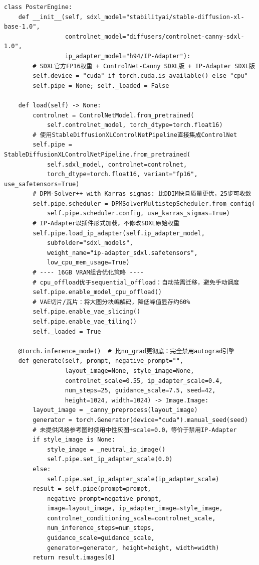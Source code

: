 \documentclass[12pt,a4paper]{ctexart}
\begin{document}
\begin{lstlisting}[style=pycode, caption={PosterEngine核心生成引擎（engine.py，关键代码节选）}]
class PosterEngine:
    def __init__(self, sdxl_model="stabilityai/stable-diffusion-xl-base-1.0",
                 controlnet_model="diffusers/controlnet-canny-sdxl-1.0",
                 ip_adapter_model="h94/IP-Adapter"):
        # SDXL官方FP16权重 + ControlNet-Canny SDXL版 + IP-Adapter SDXL版
        self.device = "cuda" if torch.cuda.is_available() else "cpu"
        self.pipe = None; self._loaded = False

    def load(self) -> None:
        controlnet = ControlNetModel.from_pretrained(
            self.controlnet_model, torch_dtype=torch.float16)
        # 使用StableDiffusionXLControlNetPipeline直接集成ControlNet
        self.pipe = StableDiffusionXLControlNetPipeline.from_pretrained(
            self.sdxl_model, controlnet=controlnet,
            torch_dtype=torch.float16, variant="fp16", use_safetensors=True)
        # DPM-Solver++ with Karras sigmas: 比DDIM快且质量更优，25步可收敛
        self.pipe.scheduler = DPMSolverMultistepScheduler.from_config(
            self.pipe.scheduler.config, use_karras_sigmas=True)
        # IP-Adapter以插件形式加载，不修改SDXL原始权重
        self.pipe.load_ip_adapter(self.ip_adapter_model,
            subfolder="sdxl_models",
            weight_name="ip-adapter_sdxl.safetensors",
            low_cpu_mem_usage=True)
        # ---- 16GB VRAM组合优化策略 ----
        # cpu_offload优于sequential_offload：自动按需迁移，避免手动调度
        self.pipe.enable_model_cpu_offload()
        # VAE切片/瓦片：将大图分块编解码，降低峰值显存约60%
        self.pipe.enable_vae_slicing()
        self.pipe.enable_vae_tiling()
        self._loaded = True

    @torch.inference_mode()  # 比no_grad更彻底：完全禁用autograd引擎
    def generate(self, prompt, negative_prompt="",
                 layout_image=None, style_image=None,
                 controlnet_scale=0.55, ip_adapter_scale=0.4,
                 num_steps=25, guidance_scale=7.5, seed=42,
                 height=1024, width=1024) -> Image.Image:
        layout_image = _canny_preprocess(layout_image)
        generator = torch.Generator(device="cuda").manual_seed(seed)
        # 未提供风格参考图时使用中性灰图+scale=0.0，等价于禁用IP-Adapter
        if style_image is None:
            style_image = _neutral_ip_image()
            self.pipe.set_ip_adapter_scale(0.0)
        else:
            self.pipe.set_ip_adapter_scale(ip_adapter_scale)
        result = self.pipe(prompt=prompt,
            negative_prompt=negative_prompt,
            image=layout_image, ip_adapter_image=style_image,
            controlnet_conditioning_scale=controlnet_scale,
            num_inference_steps=num_steps,
            guidance_scale=guidance_scale,
            generator=generator, height=height, width=width)
        return result.images[0]
\end{lstlisting}
\end{document}
